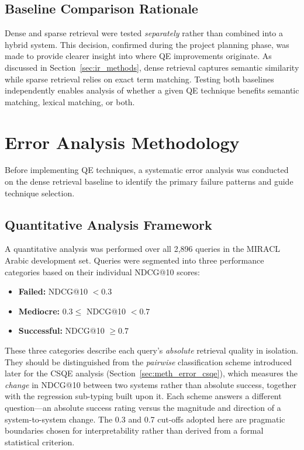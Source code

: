 \subsection{Baseline Comparison Rationale}
\label{sec:meth_baseline_rationale}

Dense and sparse retrieval were tested \emph{separately} rather than combined into a hybrid system. This decision, confirmed during the project planning phase, was made to provide clearer insight into where QE improvements originate. As discussed in Section~\ref{sec:ir_methods}, dense retrieval captures semantic similarity while sparse retrieval relies on exact term matching. Testing both baselines independently enables analysis of whether a given QE technique benefits semantic matching, lexical matching, or both.

\section{Error Analysis Methodology}
\label{sec:meth_error}

Before implementing QE techniques, a systematic error analysis was conducted on the dense retrieval baseline to identify the primary failure patterns and guide technique selection.

\subsection{Quantitative Analysis Framework}
\label{sec:meth_error_quant}

A quantitative analysis was performed over all 2,896 queries in the MIRACL Arabic development set. Queries were segmented into three performance categories based on their individual NDCG@10 scores:

\begin{itemize}
    \item \textbf{Failed:} NDCG@10 $< 0.3$
    \item \textbf{Mediocre:} $0.3 \leq$ NDCG@10 $< 0.7$
    \item \textbf{Successful:} NDCG@10 $\geq 0.7$
\end{itemize}

These three categories describe each query's \emph{absolute} retrieval quality in isolation. They should be distinguished from the \emph{pairwise} classification scheme introduced later for the CSQE analysis (Section~\ref{sec:meth_error_csqe}), which measures the \emph{change} in NDCG@10 between two systems rather than absolute success, together with the regression sub-typing built upon it. Each scheme answers a different question---an absolute success rating versus the magnitude and direction of a system-to-system change. The 0.3 and 0.7 cut-offs adopted here are pragmatic boundaries chosen for interpretability rather than derived from a formal statistical criterion.


